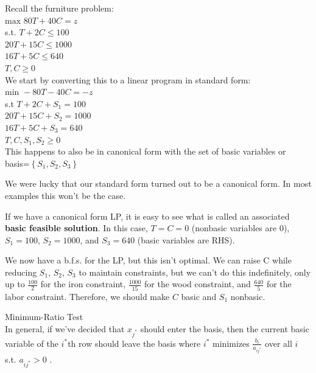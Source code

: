 \documentclass{article}
\begin{document}
\begin{eg}
    Recall the furniture problem: \\
    \(\text{max }80T+40C=z\) \\
    s.t. \(T+2C\leq100\) \\
    \(20T+15C\leq1000\) \\
    \(16T+5C\leq640\) \\
    \(T,C\geq0\)\\
    
    We start by converting this to a linear program in standard form: \\
    \(\text{min }-80T-40C=-z\) \\
    s.t \(T+2C+S_1=100\) \\
    \(20T+15C+S_2=1000\) \\
    \(16T+5C+S_3=640\) \\
    \(T, C, S_1, S_2\geq0\) \\
    
    This happens to also be in canonical form with the set of basic variables 
    or basis=\(\left\{S_1, S_2, S_3\right\}\)     
\end{eg}

\begin{remark}
    We were lucky that our standard form turned out to be a canonical form. In most 
    examples this won't be the case.
\end{remark} 

\begin{remark}
    If we have a canonical form LP, it is easy to see what is called an associated \textbf{basic feasible solution}. 
    In this case, \(T=C=0\) (nonbasic variables are 0), \(S_1=100\), \(S_2=1000\), and \(S_3=640\) (basic variables are RHS).    
\end{remark}

We now have a b.f.s. for the LP, but this isn't optimal. We can raise C while reducing 
\(S_1\), \(S_2\), \(S_3\) to maintain constraints, but we can't do this indefinitely, only 
up to \(\frac{100}{2}\) for the iron constraint, \(\frac{1000}{15}\) for the wood constraint, 
and \(\frac{640}{5}\) for the labor constraint. Therefore, we should make \(C\) basic and \(S_1\) nonbasic.

\begin{theorem}{Minimum-Ratio Test}\\
    In general, if we've decided that \(x_{j^*}\) should enter the basis, then the current basic 
    variable of the \(i^*\)th row should leave the basis where \(i^*\) minimizes \(\frac{b_i}{a_{ij^*}}\) over 
    all \(i\) s.t. \(a_{ij^*}>0\) .    
\end{theorem}
\end{document}
